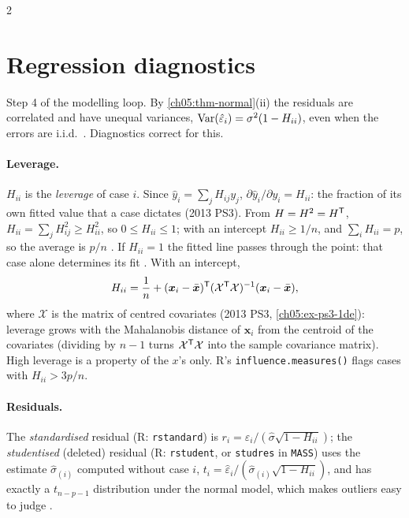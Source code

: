 \begin{paracol}{2}
\section{Regression diagnostics}\label{ch05:sec-diag}
Step 4 of the modelling loop. By \cref{ch05:thm-normal}(ii) the residuals are correlated and have unequal variances,
$\operatorname{Var}(\hat\varepsilon_i)=\sigma^2(1-H_{ii})$, even when the errors are i.i.d.\ . Diagnostics correct for this.

\paragraph{Leverage.} $H_{ii}$ is the \emph{leverage} of case $i$. Since $\hat y_i=\sum_jH_{ij}y_j$, $\partial\hat y_i/\partial y_i=H_{ii}$: the
fraction of its own fitted value that a case dictates (2013 PS3). From $H=H^2=H^{\mathsf T}$,
$H_{ii}=\sum_jH_{ij}^2\ge H_{ii}^2$, so $0\le H_{ii}\le1$; with an intercept $H_{ii}\ge1/n$, and $\sum_iH_{ii}=p$, so the average is
$p/n$ . If $H_{ii}=1$ the fitted line passes through the point: that case alone determines its
fit . With an intercept,
\[
  H_{ii}=\frac1n+(\bm x_i-\bar{\bm x})^{\mathsf T}(\mathcal X^{\mathsf T}\mathcal X)^{-1}(\bm x_i-\bar{\bm x}),
\]
where $\mathcal X$ is the matrix of centred covariates (2013 PS3, \cref{ch05:ex-ps3-1de}): leverage grows with the
Mahalanobis distance of $\bm x_i$ from the centroid of the covariates (dividing by $n-1$ turns $\mathcal X^{\mathsf T}\mathcal X$ into the sample
covariance matrix). High leverage is a property of the $x$'s only. R's \texttt{influence.measures()} flags cases with
$H_{ii}>3p/n$.

\paragraph{Residuals.} The \emph{standardised} residual (R: \texttt{rstandard}) is
$r_i=\hat\varepsilon_i/(\hat\sigma\sqrt{1-H_{ii}})$; the \emph{studentised} (deleted) residual (R: \texttt{rstudent}, or
\texttt{studres} in \texttt{MASS}) uses the estimate $\hat\sigma_{(i)}$ computed without case $i$,
$t_i=\hat\varepsilon_i/(\hat\sigma_{(i)}\sqrt{1-H_{ii}})$, and has exactly a $t_{n-p-1}$ distribution under the normal model, which makes
outliers easy to judge .


\end{paracol}
